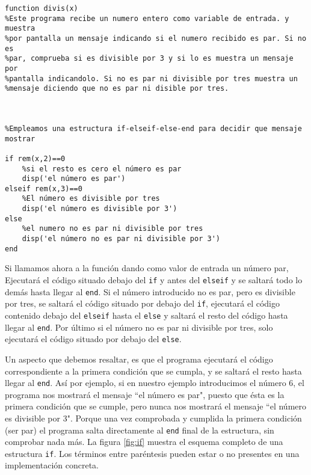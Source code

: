 \begin{verbatim}
function divis(x)
%Este programa recibe un numero entero como variable de entrada. y muestra
%por pantalla un mensaje indicando si el numero recibido es par. Si no es
%par, comprueba si es divisible por 3 y si lo es muestra un mensaje por  
%pantalla indicandolo. Si no es par ni divisible por tres muestra un
%mensaje diciendo que no es par ni disible por tres. 



%Empleamos una estructura if-elseif-else-end para decidir que mensaje mostrar

if rem(x,2)==0
    %si el resto es cero el número es par
    disp('el número es par')
elseif rem(x,3)==0
    %El número es divisible por tres
    disp('el número es divisible por 3')
else
    %el numero no es par ni divisible por tres
    disp('el número no es par ni divisible por 3')
end
\end{verbatim}

Si llamamos ahora a la función dando como valor de entrada un número par, Ejecutará el código situado debajo del \texttt{if} y antes del \texttt{elseif} y se saltará todo lo demás hasta llegar al \texttt{end}. Si el número introducido no es par, pero es divisible por tres, se saltará el código situado por debajo del \texttt{if}, ejecutará el código contenido debajo del \texttt{elseif} hasta el \texttt{else} y saltará el resto del código hasta llegar al \texttt{end}. Por último si el número no es par ni divisible por tres, solo ejecutará el código situado por debajo del \texttt{else}.

Un aspecto que debemos resaltar, es que el programa ejecutará el código correspondiente a la primera condición que se cumpla, y se saltará el resto hasta llegar al \texttt{end}. Así por ejemplo, si en nuestro ejemplo introducimos el número $6$, el programa nos mostrará el mensaje ``el número es par", puesto que ésta es la primera condición que se cumple, pero nunca nos mostrará el mensaje ``el número es divisible por 3". Porque una vez comprobada y cumplida la primera condición (ser par) el programa salta directamente al \texttt{end} final de la estructura, sin comprobar nada más. La figura \ref{fig:if} muestra el esquema completo de una estructura \texttt{if}. Los términos entre paréntesis pueden estar o no presentes en una implementación concreta.

